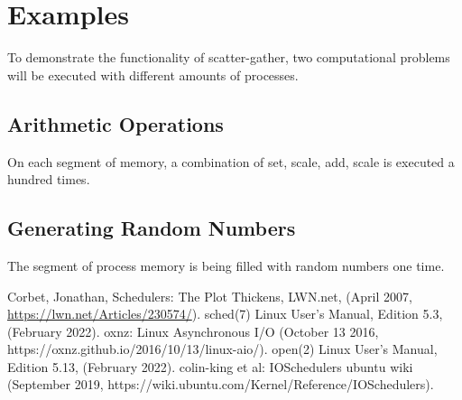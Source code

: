 \documentclass[a4paper]{article}
\begin{document}
\section{Examples}

To demonstrate the functionality of scatter-gather, two computational problems will be executed with different amounts of processes. 

\subsection{Arithmetic Operations}
On each segment of memory, a combination of set, scale, add, scale is executed a hundred times. 

\subsection{Generating Random Numbers}
The segment of process memory is being filled with random numbers one time.



\begin{thebibliography}{99}
	 Corbet, Jonathan, Schedulers: The Plot Thickens, LWN.net, (April 2007, \href{https://lwn.net/Articles/230574/}{https://lwn.net/Articles/230574/}).
	 sched(7) Linux User's Manual, Edition 5.3, (February 2022).
     oxnz: Linux Asynchronous I/O (October 13 2016, https://oxnz.github.io/2016/10/13/linux-aio/).
     open(2) Linux User's Manual, Edition 5.13, (February 2022).
     colin-king et al: IOSchedulers ubuntu wiki (September 2019, https://wiki.ubuntu.com/Kernel/Reference/IOSchedulers).
\end{thebibliography}
\end{document}
